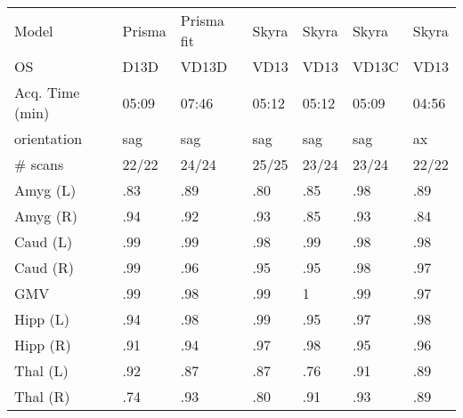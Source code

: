 \documentclass{article}
\begin{document}
\begin{table}
\begin{tabular}{lllllll}
Model                 &               Prisma &           Prisma fit &              Skyra &               Skyra &               Skyra &               Skyra \\
OS                    &                 D13D &                VD13D &               VD13 &                VD13 &               VD13C &                VD13 \\
Acq. Time (min)       &             05:09 &             07:46 &           05:12 &            05:12 &            05:09 &            04:56 \\
orientation           &                  sag &                  sag &                sag &                 sag &                 sag &                  ax \\
\# scans & 22/22 & 24/24 & 25/25 & 23/24 & 23/24 &22/22 \\
\midrule
Amyg (L)              &                 .83 &                 .89 &               .80 &                .85 &                .98 &                .89 \\
Amyg (R)              &                 .94 &                 .92 &               .93 &                .85 &                .93 &                .84 \\
Caud (L)              &                 .99 &                 .99 &               .98 &                .99 &                .98 &                .98 \\
Caud (R)              &                 .99 &                 .96 &               .95 &                .95 &                .98 &                .97 \\
GMV                   &                 .99 &                 .98 &               .99 &                1   &                .99 &                .97 \\
Hipp (L)              &                 .94 &                 .98 &               .99 &                .95 &                .97 &                .98 \\
Hipp (R)              &                 .91 &                 .94 &               .97 &                .98 &                .95 &                .96 \\
Thal (L)              &                 .92 &                 .87 &               .87 &                .76 &                .91 &                .89 \\
Thal (R)              &                 .74 &                 .93 &               .80 &                .91 &                .93 &                .89 \\

\end{tabular}
\end{table}
\end{document}
